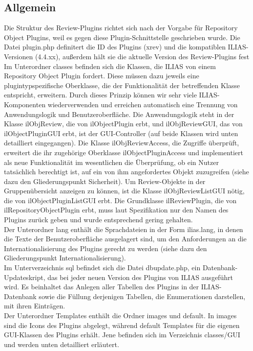 \documentclass[a4paper]{scrreprt}
\begin{document}
\subsection{Allgemein}
Die Struktur des Review-Plugins richtet sich nach der Vorgabe für Repository Object Plugins, weil es gegen diese Plugin-Schnittstelle geschrieben wurde. Die Datei plugin.php definitert die ID des Plugins (xrev) und die kompatiblen ILIAS-Versionen (4.4.xx), außerdem hält sie die aktuelle Version des Review-Plugins fest\\
Im Unterordner classes befinden sich die Klassen, die ILIAS von einem Repository Object Plugin fordert. Diese müssen dazu jeweils eine plugintypspezifische Oberklasse, die der Funktionalität der betreffenden Klasse entspricht, erweitern. Durch dieses Prinzip können wir sehr viele ILIAS-Komponenten wiederverwenden und erreichen automatisch eine Trennung von Anwendungslogik und Benutzeroberfläche. Die Anwendungslogik steht in der Klasse ilObjReview, die von ilObjectPlugin erbt, und ilObjReviewGUI, das von ilObjectPluginGUI erbt, ist der GUI-Controller (auf beide Klassen wird unten detailliert eingegangen). Die Klasse ilObjReviewAccess, die Zugriffe überprüft, erweitert die ihr zugehörige Oberklasse ilObjectPluginAccess und implementiert als neue Funktionalität im wesentlichen die Überprüfung, ob ein Nutzer tatsächlich berechtigt ist, auf ein von ihm angefordertes Objekt zuzugreifen (siehe dazu den Gliederungspunkt Sicherheit). Um Review-Objekte in der Gruppenübersicht anzeigen zu können, ist die Klasse ilObjReviewListGUI nötig, die von ilObjectPluginListGUI erbt. Die Grundklasse ilReviewPlugin, die von ilRepositoryObjectPlugin erbt, muss laut Spezifikation nur den Namen des Plugins zurück geben und wurde entsprechend gering gehalten.\\
Der Unterordner lang enthält die Sprachdateien in der Form ilias\textunderscore[Sprachkürzel].lang, in denen die Texte der Benutzeroberfläche ausgelagert sind, um den Anforderungen an die Internationalisierung des Plugins gerecht zu werden (siehe dazu den Gliederungspunkt Internationalisierung).\\
Im Unterverzeichnis sql befindet sich die Datei dbupdate.php, ein Datenbank-Updateskript, das bei jeder neuen Version des Plugins von ILIAS ausgeführt wird. Es beinhaltet das Anlegen aller Tabellen des Plugins in der ILIAS-Datenbank sowie die Füllung derjenigen Tabellen, die Enumerationen darstellen, mit ihren Einträgen.\\
Der Unterordner Templates enthält die Ordner images und default. In images sind die Icons des Plugins abgelegt, während default Templates für die eigenen GUI-Klassen des Plugins erhält. Jene befinden sich im Verzeichnis classes/GUI und werden unten detailliert erläutert.\\
\end{document}
